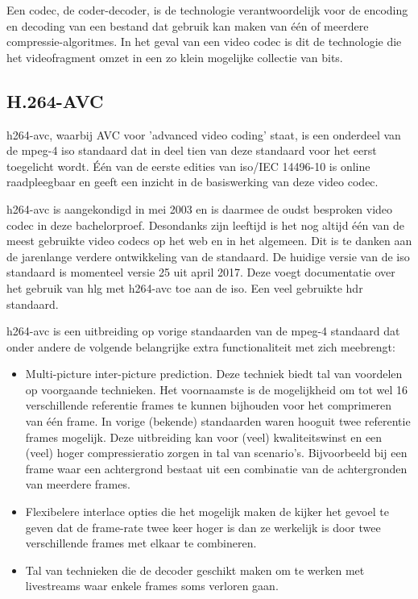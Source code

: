 Een \gls{codec}, de coder-decoder, is de technologie verantwoordelijk voor de \gls{encoding} en \gls{decoding} van een bestand dat gebruik kan maken van één of meerdere \glspl{compressie-algoritme}. In het geval van een video \gls{codec} is dit de technologie die het videofragment omzet in een zo klein mogelijke collectie van \glspl{bit}.

\subsection{H.264-AVC}
\label{sec:videocompressie-h264-AVC}

\Gls{h264-avc}, waarbij AVC voor 'advanced video coding' staat, is een onderdeel van de \gls{mpeg-4} \gls{iso} standaard dat in deel tien van deze standaard voor het eerst toegelicht wordt. Één van de eerste edities van \gls{iso}/IEC 14496-10 is online raadpleegbaar en geeft een inzicht in de basiswerking van deze video \gls{codec}.

\Gls{h264-avc} is aangekondigd in mei 2003 en is daarmee de oudst besproken video \gls{codec} in deze bachelorproef. Desondanks zijn leeftijd is het nog altijd één van de meest gebruikte video \glspl{codec} op het web en in het algemeen. Dit is te danken aan de jarenlange verdere ontwikkeling van de standaard. De huidige versie van de \gls{iso} standaard is momenteel versie 25 uit april 2017. Deze voegt documentatie over het gebruik van \gls{hlg} met \gls{h264-avc} toe aan de \gls{iso}. Een veel gebruikte \gls{hdr} standaard.

\Gls{h264-avc} is een uitbreiding op vorige standaarden van de \gls{mpeg-4} standaard dat onder andere de volgende belangrijke extra functionaliteit met zich meebrengt:

\begin{itemize}
	\item Multi-picture inter-picture prediction. Deze techniek biedt tal van voordelen op voorgaande technieken. Het voornaamste is de mogelijkheid om tot wel 16 verschillende referentie \glspl{frame} te kunnen bijhouden voor het comprimeren van één \gls{frame}. In vorige (bekende) standaarden waren hooguit twee referentie \glspl{frame} mogelijk. Deze uitbreiding kan voor (veel) kwaliteitswinst en een (veel) hoger \gls{compressieratio} zorgen in tal van scenario's. Bijvoorbeeld bij een \gls{frame} waar een achtergrond bestaat uit een combinatie van de achtergronden van meerdere \glspl{frame}.
	
	\item Flexibelere interlace opties die het mogelijk maken de kijker het gevoel te geven dat de \gls{frame-rate} twee keer hoger is dan ze werkelijk is door twee verschillende \glspl{frame} met elkaar te combineren.
	
	\item Tal van technieken die de \gls{decoder} geschikt maken om te werken met livestreams waar enkele \glspl{frame} soms verloren gaan.
\end{itemize}

